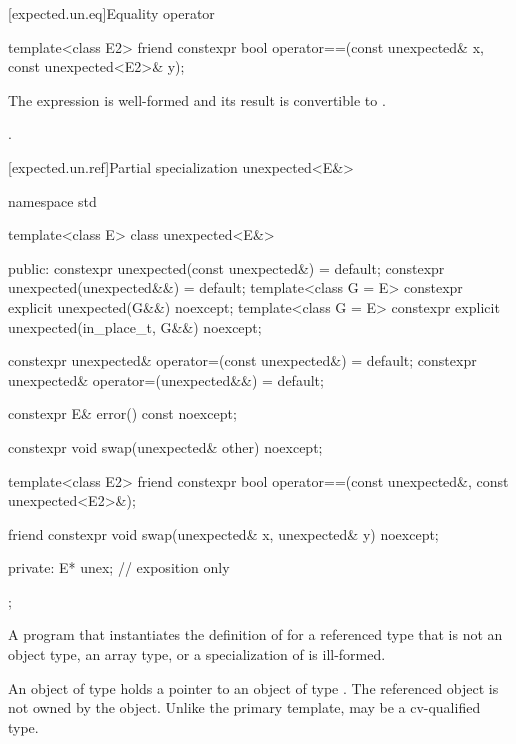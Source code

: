 [expected.un.eq]{Equality operator}

%
\begin{itemdecl}
template<class E2>
friend constexpr bool operator==(const unexpected& x, const unexpected<E2>& y);
\end{itemdecl}

\begin{itemdescr}
\pnum
\mandates
The expression  is well-formed and its result is convertible to .

\pnum
\returns
{}.
\end{itemdescr}

[expected.un.ref]{Partial specialization unexpected<E&>}

\begin{codeblock}
namespace std {
  template<class E>
  class unexpected<E&> {
  public:
    constexpr unexpected(const unexpected&) = default;
    constexpr unexpected(unexpected&&) = default;
    template<class G = E>
      constexpr explicit unexpected(G&&) noexcept;
    template<class G = E>
      constexpr explicit unexpected(in_place_t, G&&) noexcept;

    constexpr unexpected& operator=(const unexpected&) = default;
    constexpr unexpected& operator=(unexpected&&) = default;

    constexpr E& error() const noexcept;

    constexpr void swap(unexpected& other) noexcept;

    template<class E2>
      friend constexpr bool operator==(const unexpected&, const unexpected<E2>&);

    friend constexpr void swap(unexpected& x, unexpected& y) noexcept;

  private:
    E* unex;              // exposition only
  };
}
\end{codeblock}

\begin{itemdescr}
\pnum
\mandates
A program that instantiates the definition of  for a referenced type that is not an object type, an array type, or a specialization of  is ill-formed.

\pnum
\remarks
An object of type  holds a pointer to an object of type . The referenced object is not owned by the  object. Unlike the primary template,  may be a cv-qualified type.
\end{itemdescr}

